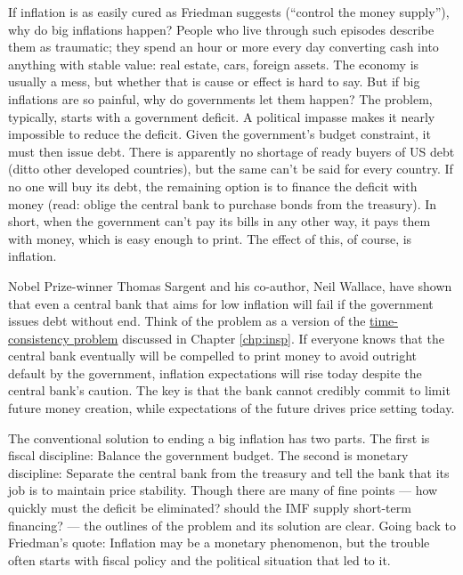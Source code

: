 If inflation is as easily cured as Friedman suggests
(``control the money supply''),
why do big inflations happen?
People who live through such
episodes describe them as traumatic; they spend an hour or more
every day converting cash into anything with stable value:  real estate,
cars, foreign assets.
The economy is usually a mess, but whether that is cause or effect is
hard to say.
But if big inflations are so painful, why do governments let them happen?
The problem, typically, starts with a government deficit.
A political impasse makes it nearly impossible to reduce the deficit.
Given the government's budget constraint, it must then issue debt.
There is apparently no shortage of ready buyers of US debt
(ditto other developed countries),
but the same can't be said for every country.
If no one will buy its debt,
the remaining option is to finance the deficit with money
(read: oblige the central bank to purchase bonds
from the treasury).
In short, when the government can't
pay its bills in any other way, it pays them with money, which is
easy enough to print.
The effect of this, of course, is inflation.

Nobel Prize-winner Thomas Sargent and his co-author, Neil Wallace,
have shown that even a central bank that aims for low inflation will fail
 if the government issues debt without end. Think of the problem as
 a version of the \hyperref[sec:time_cons]{time-consistency problem} discussed in Chapter \ref{chp:insp}. If everyone knows that the
 central bank eventually will be compelled to print money to avoid outright default by the government, inflation expectations
 will rise today despite the central bank's caution. The key is
 that the bank cannot credibly commit to limit future money creation, while
 expectations of the future drives price setting today.

The conventional solution to ending a big inflation has two parts.  The
first is fiscal discipline: Balance the government budget.  The
second is monetary discipline: Separate the central bank
from the treasury and tell the bank that its job is to maintain
price stability. Though there are many of fine points --- how quickly must
the deficit be eliminated?  should the IMF supply short-term
financing?  --- the outlines of the problem and its solution
are clear.
Going back to Friedman's quote: Inflation may be a monetary phenomenon,
but the trouble often starts with fiscal policy and the political situation that led to it.

